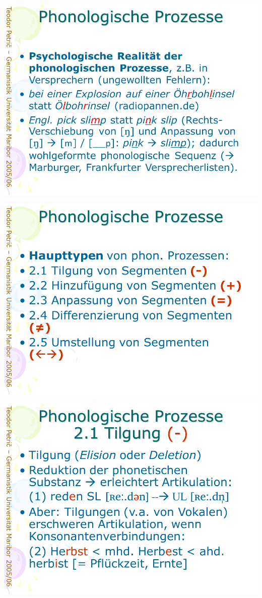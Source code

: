 \documentclass[
  letterpaper,
]{scrbook}
\begin{document}
\includegraphics[width=1\textwidth,height=\textheight]{./pictures/prozesse/prozesse_6.PNG}

\includegraphics[width=1\textwidth,height=\textheight]{./pictures/prozesse/prozesse_7.PNG}

\includegraphics[width=1\textwidth,height=\textheight]{./pictures/prozesse/prozesse_8.PNG}
\end{document}
